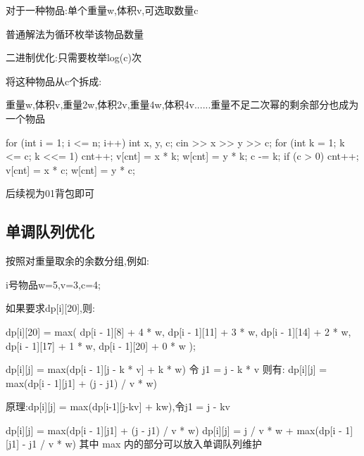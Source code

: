 \documentclass[UTF8,a4paper,11pt]{ctexart}
\newcommand{\topic}[1]{%
  \par\needspace{3\baselineskip}\vspace{0.45em}%
  \noindent{\bfseries\color{Primary}#1}\par\vspace{0.12em}%
}
\begin{document}
对于一种物品:单个重量w,体积v,可选取数量c

普通解法为循环枚举该物品数量

二进制优化:只需要枚举log(c)次

将这种物品从c个拆成:

重量w,体积v,重量2w,体积2v,重量4w,体积4v......重量不足二次幂的剩余部分也成为一个物品

\begin{CodeBlock}
for (int i = 1; i <= n; i++) {
    int x, y, c;
    cin >> x >> y >> c;
    for (int k = 1; k <= c; k <<= 1) {
        cnt++;
        v[cnt] = x * k;
        w[cnt] = y * k;
        c -= k;
    }
    if (c > 0) {
        cnt++;
        v[cnt] = x * c;
        w[cnt] = y * c;
    }
}
\end{CodeBlock}

后续视为01背包即可

\subsection{单调队列优化}

\topic{余数分组}

按照对重量取余的余数分组,例如:

\begin{CodeBlock}
i号物品w=5,v=3,c=4;
\end{CodeBlock}

如果要求dp[i][20],则:

\begin{CodeBlock}
dp[i][20] = max(
    dp[i - 1][8]  + 4 * w,
    dp[i - 1][11] + 3 * w,
    dp[i - 1][14] + 2 * w,
    dp[i - 1][17] + 1 * w,
    dp[i - 1][20] + 0 * w
);
\end{CodeBlock}

\topic{状态转移变形}

\begin{CodeBlock}
dp[i][j] = max(dp[i - 1][j - k * v] + k * w)
令 j1 = j - k * v
则有:
dp[i][j] = max(dp[i - 1][j1] + (j - j1) / v * w)
\end{CodeBlock}

原理:dp[i][j] = max(dp[i-1][j-kv] + kw),令j1 = j - kv

\begin{CodeBlock}
dp[i][j] = max(dp[i - 1][j1] + (j - j1) / v * w)
dp[i][j] = j / v * w + max(dp[i - 1][j1] - j1 / v * w)
其中 max 内的部分可以放入单调队列维护
\end{CodeBlock}
\end{document}
